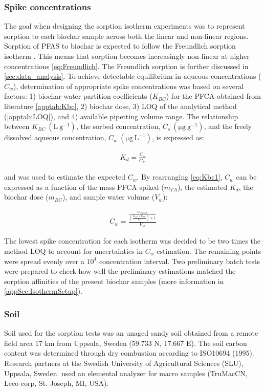 \subsubsection{Spike concentrations}
The goal when designing the sorption isotherm experiments was to represent sorption to each biochar sample across both the linear and non-linear regions. Sorption of PFAS to biochar is expected to follow the Freundlich sorption isotherm \citep{Hale2016, kupryianchyk2016biochar}. This means that sorption becomes increasingly non-linear at higher concentrations \cref{eq:Freundlich}. The Freundlich sorption is further discussed in \cref{sec:data_analysis}. To achieve detectable equilibrium in aqueous concentrations ($C_w$), determination of appropriate spike concentrations was based on several factors: 1) biochar-water partition coefficients ($K_{BC}$) for the PFCA obtained from literature \cite{Xiao2017} \cref{apptab:Kbc}, 2) biochar dose, 3) LOQ of the analytical method (\cref{apptab:LOQ}), and 4) available pipetting volume range. The relationship between $K_{BC}~\mathrm{(L~g^{-1})}$, the sorbed concentration, $C_s~\mathrm{(\mu g~g^{-1})}$, and the freely dissolved aqueous concentration, $C_w~\mathrm{(\mu g~L^{-1})}$, is expressed as:

\begin{align}
    \label{eq:Kbc1}
    K_{d} = \frac{C_s}{C_w}
\end{align}

and was used to estimate the expected $C_w$. By rearranging \cref{eq:Kbc1}, $C_w$ can be expressed as a function of the mass PFCA spiked ($m_{TA}$), the estimated $K_d$, the biochar dose ($m_{BC}$), and sample water volume ($V_w$):

\begin{align}
    \label{eq:Cw2}
    C_w=\frac{\frac{m_{PFAS}}{\left (\frac{m_{BC}\times K_{BC}}{V_w}\right)+1}}{V_w}
\end{align}

The lowest spike concentration for each isotherm was decided to be two times the method LOQ to account for uncertainties in $C_w$-estimation. The remaining points were spread evenly over a $10^4$ concentration interval. Two preliminary batch tests were prepared to check how well the preliminary estimations matched the sorption affinities of the present biochar samples (more information in \cref{appSec:IsothermSetup}).

\subsubsection{Soil}
Soil used for the sorption tests was an unaged sandy soil obtained from a remote field area 17 km from Uppsala, Sweden (59.733 N, 17.667 E). The soil carbon content was determined through dry combustion according to ISO10694 (1995).  Research partners at the Swedish University of Agricultural Sciences (SLU), Uppsala, Sweden. used an elemental analyzer for macro samples (TruMac\textregistered CN, Leco corp, St. Joseph, MI, USA). 


